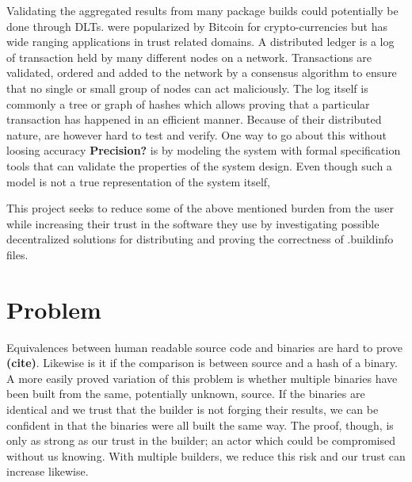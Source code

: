 \documentclass[english, biblatex, digitaloutput]{kththesis}
\begin{document}
Validating the aggregated results from many package builds could potentially be done through \glspl{DLT}.  were popularized by Bitcoin \cite{di_pierro_what_2017, nakamoto_bitcoin_nodate} for crypto-currencies but has wide ranging applications in trust related domains. A distributed ledger is a log of transaction held by many different nodes on a network. Transactions are validated, ordered and added to the network by a consensus algorithm to ensure that no single or small group of nodes can act maliciously. The log itself is commonly a tree or graph of hashes which allows proving that a particular transaction has happened in an efficient manner. Because of their distributed nature,  are however hard to test and verify. One way to go about this without loosing accuracy \textbf{Precision?} is by modeling the system with formal specification tools that can validate the properties of the system design. Even though such a model is not a true representation of the system itself,

This project seeks to reduce some of the above mentioned burden from the user while increasing their trust in the software they use by investigating possible decentralized solutions for distributing and proving the correctness of .buildinfo files.

\section{Problem}
\label{sec:problem}


Equivalences between human readable source code and binaries are hard to prove \textbf{(cite)}. Likewise is it if the comparison is between source and a hash of a binary. A more easily proved variation of this problem is whether multiple binaries have been built from the same, potentially unknown, source. If the binaries are identical and we trust that the builder is not forging their results, we can be confident in that the binaries were all built the same way. The proof, though, is only as strong as our trust in the builder; an actor which could be compromised without us knowing. With multiple builders, we reduce this risk and our trust can increase likewise.
\end{document}

